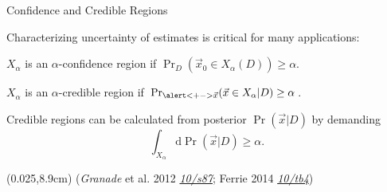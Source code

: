 \documentclass[xcolor=dvipsnames, compress]{beamer}
\renewcommand\UrlFont{\color{red}\rmfamily\itshape}
\newcommand{\shortdoi}[1]{\href{http://doi.org/#1}{\UrlFont 10/#1}}
\newcommand{\dd}{\mathrm{d}}
\newcommand{\bottomnote}[1]{
  \begin{textblock*}{0.95\paperwidth} (0.025\paperwidth,8.9cm)
    {\tiny \hfill #1}
  \end{textblock*}
}
\begin{document}

\begin{frame}{Confidence and Credible Regions}

    Characterizing uncertainty of estimates is critical
    for many applications:

    \begin{definition}
      $X_\alpha$ is an $\alpha$-confidence region if $\Pr_D(\vec{x}_0 \in X_\alpha(D)) \ge \alpha$.
    \end{definition}

    \begin{definition}
      $X_\alpha$ is an $\alpha$-credible region if $\Pr_{\alert<+->{\vec{x}}}(\vec{x} \in X_\alpha | D) \ge \alpha$.
    \end{definition}

    Credible regions can be calculated from posterior $\Pr(\vec{x} | D)$
    by demanding
    $$
      \int_{X_\alpha} \dd\Pr(\vec{x} | D) \ge \alpha.
    $$

  \bottomnote{(\emph{Granade} et al. 2012 \shortdoi{s87}; Ferrie 2014 \shortdoi{tb4})}

\end{frame}
\end{document}
